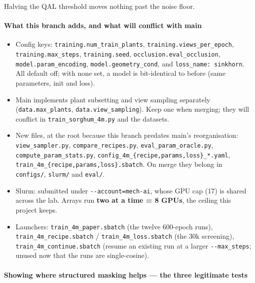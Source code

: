 \documentclass[
  10pt,
]{article}
\newcounter{none} %
\providecommand{\tightlist}{%
  \setlength{\itemsep}{0pt}\setlength{\parskip}{0pt}}
\begin{document}
Halving the QAL threshold moves nothing past the noise floor.

\paragraph{What this branch adds, and what will conflict with
main}\label{what-this-branch-adds-and-what-will-conflict-with-main}

\begin{itemize}
\tightlist
\item
  Config keys: \texttt{training.num\_train\_plants},
  \texttt{training.views\_per\_epoch}, \texttt{training.max\_steps},
  \texttt{training.seed}, \texttt{occlusion.eval\_occlusion},
  \texttt{model.param\_encoding}, \texttt{model.geometry\_cond}, and
  \texttt{loss\_name:\ sinkhorn}. All default off; with none set, a
  model is bit-identical to before (same parameters, init and loss).
\item
  Main implements plant subsetting and view sampling separately
  (\texttt{data.max\_plants}, \texttt{data.view\_sampling}). Keep one
  when merging; they will conflict in \texttt{train\_sorghum\_4m.py} and
  the datasets.
\item
  New files, at the root because this branch predates main's
  reorganisation: \texttt{view\_sampler.py},
  \texttt{compare\_recipes.py}, \texttt{eval\_param\_oracle.py},
  \texttt{compute\_param\_stats.py},
  \texttt{config\_4m\_\{recipe,params,loss\}\_*.yaml},
  \texttt{train\_4m\_\{recipe,params,loss\}.sbatch}. On merge they
  belong in \texttt{configs/}, \texttt{slurm/} and \texttt{eval/}.
\item
  Slurm: submitted under \texttt{-\/-account=mech-ai}, whose GPU cap
  (17) is shared across the lab. Arrays run \textbf{two at a time = 8
  GPUs}, the ceiling this project keeps.
\item
  Launchers: \texttt{train\_4m\_paper.sbatch} (the twelve 600-epoch
  runs), \texttt{train\_4m\_recipe.sbatch} /
  \texttt{train\_4m\_loss.sbatch} (the 30k screening),
  \texttt{train\_4m\_continue.sbatch} (resume an existing run at a
  larger \texttt{-\/-max\_steps}; unused now that the runs are
  single-cosine).
\end{itemize}

\paragraph{Showing where structured masking helps --- the three
legitimate
tests}\label{showing-where-structured-masking-helps-the-three-legitimate-tests}
\end{document}
